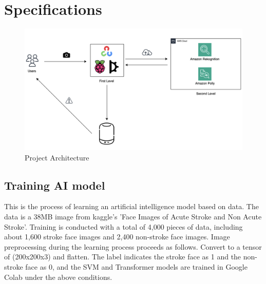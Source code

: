 \section{\textbf{Specifications}}


\begin{figure}[h]
    \centering
    \includegraphics[width=1\linewidth]{images/architecture.png}
    \caption{Project Architecture}
    \label{fig:enter-label}
\end{figure}

\subsection{\textbf{Training AI model}}
This is the process of learning an artificial intelligence model based on data. The data is a 38MB image from kaggle's 'Face Images of Acute Stroke and Non Acute Stroke'. Training is conducted with a total of 4,000 pieces of data, including about 1,600 stroke face images and 2,400 non-stroke face images. Image preprocessing during the learning process proceeds as follows. Convert to a tensor of (200x200x3) and flatten. The label indicates the stroke face as 1 and the non-stroke face as 0, and the SVM and Transformer models are trained in Google Colab under the above conditions.\\

